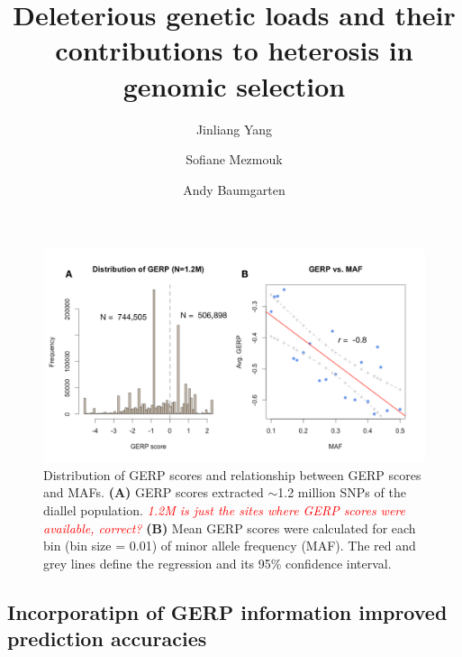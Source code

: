 \documentclass[9pt,twocolumn,twoside]{gsajnl}
\newcommand{\jri}[1]{\textcolor{red}{ \emph{ #1}} }  \title{Deleterious genetic loads and their contributions to heterosis in genomic selection}  \author[$\ast$, 1]{Jinliang Yang} \author[$\ast$, 1, 2]{Sofiane Mezmouk} \author[$\dagger$]{Andy Baumgarten}
\begin{document}
\begin{figure}[htbp]
\centering
\includegraphics[width=\linewidth]{Figure_gerpmaf.pdf}
\caption{Distribution of GERP scores and relationship between GERP scores and MAFs. \textbf{(A)} GERP scores \DIFdelbeginFL {}\DIFdelendFL extracted \DIFdelbeginFL {}\DIFdelendFL \DIFaddbeginFL {}\DIFaddendFL $\sim$1.2 million SNPs \DIFdelbeginFL {}\DIFdelendFL of the \DIFdelbeginFL {}\DIFdelendFL diallel population. \DIFdelbeginFL {}\DIFdelendFL \DIFaddbeginFL \jri{1.2M is just the sites where GERP scores were available, correct?} \DIFaddendFL \textbf{(B)} Mean GERP scores were calculated for each bin (bin size = 0.01) of minor allele frequency (MAF). The red  \DIFdelbeginFL {}\DIFdelendFL and grey lines define the regression and its 95\% confidence interval.}
\label{fig:gerpmaf}
\end{figure}


\subsection*{Incorporatipn of GERP information improved prediction accuracies}
\end{document}
